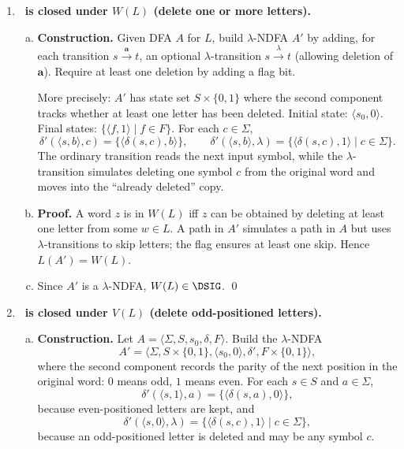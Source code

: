 \begin{enumerate}[{5.}1. ]
\item \textbf{\DSIG\ is closed under $W(L)$ (delete one or more letters).}

\begin{enumerate}[(a)]
  \item \textbf{Construction.}  Given DFA $A$ for $L$, build $\lambda$-NDFA $A'$ by adding, for each transition $s\xrightarrow{\pmb{a}}t$, an optional $\lambda$-transition $s\xrightarrow{\lambda}t$ (allowing deletion of $\pmb{a}$).  Require at least one deletion by adding a flag bit.

  More precisely: $A'$ has state set $S\times\{0,1\}$ where the second
  component tracks whether at least one letter has been deleted.  Initial
  state: $\langle s_0,0\rangle$.  Final states:
  $\{\langle f,1\rangle\mid f\in F\}$.  For each $c\in\Sigma$,
  \[
  \delta'(\langle s,b\rangle,c)=\{\langle\delta(s,c),b\rangle\},
  \qquad
  \delta'(\langle s,b\rangle,\lambda)
    =\{\langle\delta(s,c),1\rangle\mid c\in\Sigma\}.
  \]
  The ordinary transition reads the next input symbol, while the
  $\lambda$-transition simulates deleting one symbol $c$ from the original word
  and moves into the ``already deleted'' copy.

  \item \textbf{Proof.}  A word $z$ is in $W(L)$ iff $z$ can be obtained by deleting at least one letter from some $w\in L$.  A path in $A'$ simulates a path in $A$ but uses $\lambda$-transitions to skip letters; the flag ensures at least one skip. Hence $L(A')=W(L)$.

  \item Since $A'$ is a $\lambda$-NDFA, $W(L)\in\DSIG$. \qed
\end{enumerate}

\item \textbf{\DSIG\ is closed under $V(L)$ (delete odd-positioned letters).}

\begin{enumerate}[(a)]
  \item \textbf{Construction.}  Let
  $A=\langle\Sigma,S,s_0,\delta,F\rangle$.  Build the $\lambda$-NDFA
  \[
  A'=\langle\Sigma,S\times\{0,1\},\langle s_0,0\rangle,\delta',F\times\{0,1\}\rangle,
  \]
  where the second component records the parity of the next position in the
  original word: $0$ means odd, $1$ means even.  For each $s\in S$ and
  $a\in\Sigma$,
  \[
  \delta'(\langle s,1\rangle,a)=\{\langle\delta(s,a),0\rangle\},
  \]
  because even-positioned letters are kept, and
  \[
  \delta'(\langle s,0\rangle,\lambda)
  =\{\langle\delta(s,c),1\rangle\mid c\in\Sigma\},
  \]
  because an odd-positioned letter is deleted and may be any symbol $c$.


\end{enumerate}
\end{enumerate}
